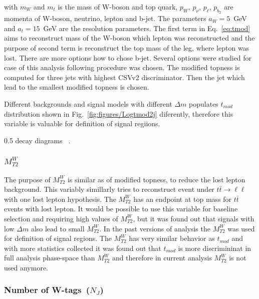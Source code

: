 with $m_{W}$ and  $m_{t}$ is the mass of W-boson and top quark, ${p}_{W}$, ${p}_{\nu}$, ${p}_{\ell}$, ${p}_{b_{2}}$ are momenta of W-boson, neutrino, lepton and b-jet. The parameters $a_{W} =5$~GeV and $a_{t}=15$~GeV are the resolution parameters. The first term in Eq.~\ref{eq:tmod} aims to reconstruct mass of the W-boson which lepton was reconstructed and the purpose of second term is reconstruct the top mass of the leg, where lepton was lost. There are more options how to chose  b-jet. Several options were studied for case of this analysis following procedure was chosen. The modified topness is computed for three jets with highest CSVv2 discriminator. Then the jet which lead to the smallest modified topness is chosen.

Different backgrounds and signal models with different $\Delta m$ populates $t_{mod}$ distribution shown in Fig.~\ref{fig:figures/Logtmod2j} diferently, therefore this variable is valuable for definition of signal regiions.

                 {0.5}       %
                 { decay diagrams ~\cite{website:stopSupp}. }

\subsubsection{$M_{T2}^{W}$}

The purpose of $M_{T2}^{W}$ is similar as of modified topness, to reduce the lost lepton background. This variably simillarly tries to reconstruct event under $t \bar{t} \to \ell \ell$ with one lost lepton hypothesis. The $M_{T2}^{W}$ has an endpoint at top mass for $t\bar{t}$ events with lost lepton. It would be possible to use this variable for baseline selection and requiring high values of $M_{T2}^{W}$, but it was found out that signals with low $\Delta m$ also lead to small $M_{T2}^{W}$. In the past versions of analysis the $M_{T2}^{W}$ was used for definition of signal regions. The $M_{T2}^{W}$ has very similar behavior as $t_{mod}$ and with more statistics collected it was found out that $t_{mod}$ is more discrimininat in full analysis phase-space than $M_{T2}^{W}$ and therefore in current analysis $M_{T2}^{W}$ is not used anymore.

\subsubsection{Number of W-tags~($N_{J}$)}

